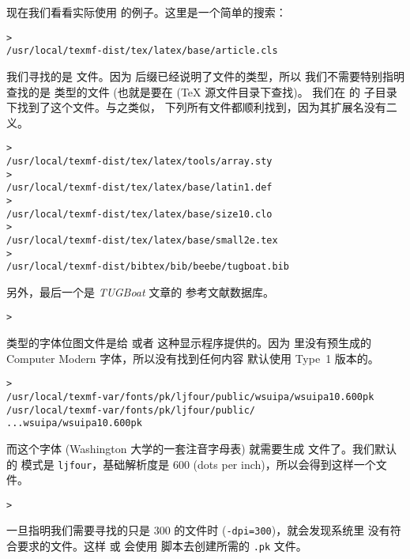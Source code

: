\documentclass{article}
\begin{document}
现在我们看看实际使用 \KPS{} 的例子。这里是一个简单的搜索：

\begin{alltt}
> 
   /usr/local/texmf-dist/tex/latex/base/article.cls
\end{alltt}
我们寻找的是  文件。因为  后缀已经说明了文件的类型，所以
我们不需要特别指明查找的是  类型的文件 (也就是要在 (\TeX{} 源文件目录下查找)。
我们在  的  子目录下找到了这个文件。与之类似，
下列所有文件都顺利找到，因为其扩展名没有二义。
\begin{alltt}
> 
   /usr/local/texmf-dist/tex/latex/tools/array.sty
> 
   /usr/local/texmf-dist/tex/latex/base/latin1.def
> 
   /usr/local/texmf-dist/tex/latex/base/size10.clo
> 
   /usr/local/texmf-dist/tex/latex/base/small2e.tex
> 
   /usr/local/texmf-dist/bibtex/bib/beebe/tugboat.bib
\end{alltt}

另外，最后一个是 \textsl{TUGBoat} 文章的 \BibTeX{} 参考文献数据库。

\begin{alltt}
> 
\end{alltt}

 类型的字体位图文件是给  或者 
这种显示程序提供的。因为 \TL{} 里没有预生成的 Computer Modern 
字体，所以没有找到任何内容\Dash \TL{} 默认使用 Type~1 版本的。

\begin{alltt}
> 
\ifSingleColumn   /usr/local/texmf-var/fonts/pk/ljfour/public/wsuipa/wsuipa10.600pk
\else /usr/local/texmf-var/fonts/pk/ljfour/public/
...                         wsuipa/wsuipa10.600pk
\fi\end{alltt}

而这个字体 (Washington 大学的一套注音字母表) 就需要生成  文件了。我们默认的
\MF{} 模式是 \texttt{ljfour}，基础解析度是 600\dpi{} (dots per inch)，所以会得到这样一个文件。
\begin{alltt}
> 
\end{alltt}

一旦指明我们需要寻找的只是 300\dpi{} 的文件时 (\texttt{-dpi=300})，就会发现系统里
没有符合要求的文件。这样  或  会使用 
脚本去创建所需的 \texttt{.pk} 文件。
\end{document}
